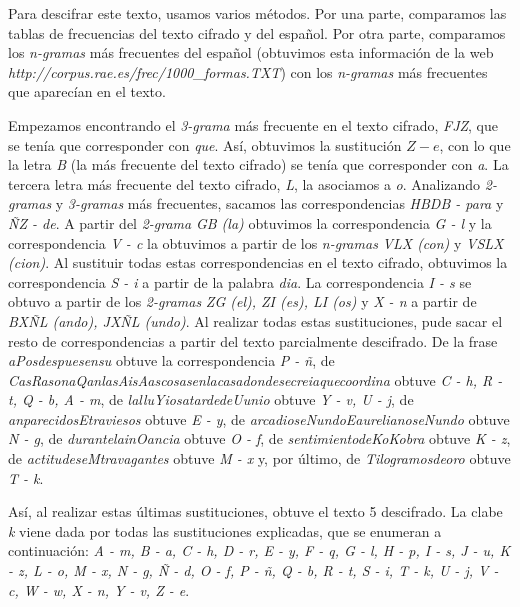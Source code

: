 \documentclass{article}
\begin{document}
    Para descifrar este texto, usamos varios métodos. Por una parte, comparamos las tablas de frecuencias del texto cifrado y del español. Por otra parte, comparamos los \emph{n-gramas} más frecuentes del español (obtuvimos esta información de la web \emph{http://corpus.rae.es/frec/1000\_formas.TXT}) con los \emph{n-gramas} más frecuentes que aparecían en el texto.
    
    Empezamos encontrando el \emph{3-grama} más frecuente en el texto cifrado, \emph{FJZ}, que se tenía que corresponder con \emph{que}. Así, obtuvimos la sustitución $Z - e$, con lo que la letra \emph{B} (la más frecuente del texto cifrado) se tenía que corresponder con \emph{a}. La tercera letra más frecuente del texto cifrado, \emph{L}, la asociamos a \emph{o}. Analizando \emph{2-gramas} y \emph{3-gramas} más frecuentes, sacamos las correspondencias \emph{HBDB - para} y \emph{ÑZ - de}. A partir del \emph{2-grama} \emph{GB (la)} obtuvimos la correspondencia \emph{G - l} y la correspondencia \emph{V - c} la obtuvimos a partir de los \emph{n-gramas} \emph{VLX (con)} y \emph{VSLX (cion)}. Al sustituir todas estas correspondencias en el texto cifrado, obtuvimos la correspondencia \emph{S - i} a partir de la palabra \emph{dia}. La correspondencia \emph{I - s} se obtuvo a partir de los \emph{2-gramas} \emph{ZG (el), ZI (es), LI (os)} y \emph{X - n} a partir de \emph{BXÑL (ando), JXÑL (undo)}. Al realizar todas estas sustituciones, pude sacar el resto de correspondencias a partir del texto parcialmente descifrado. De la frase \emph{aPosdespuesensu} obtuve la correspondencia \emph{P - ñ}, de \emph{CasRasonaQanlasAisAascosasenlacasadondesecreiaquecoordina} obtuve \emph{C - h, R - t, Q - b, A - m}, de \emph{lalluYiosatardedeUunio} obtuve \emph{Y - v, U - j}, de \emph{anparecidosEtraviesos} obtuve \emph{E - y}, de \emph{arcadioseNundoEaurelianoseNundo} obtuve \emph{N - g}, de \emph{durantelainOancia} obtuve \emph{O - f}, de \emph{sentimientodeKoKobra} obtuve \emph{K - z}, de \emph{actitudeseMtravagantes} obtuve \emph{M - x} y, por último, de \emph{Tilogramosdeoro} obtuve \emph{T - k}.
    
    Así, al realizar estas últimas sustituciones, obtuve el texto 5 descifrado. La clabe \emph{k} viene dada por todas las sustituciones explicadas, que se enumeran a continuación: 
    \emph{A - m, B - a, C - h, D - r, E - y, F - q, G - l, H - p, I - s, J - u, K - z, L - o, M - x, N - g, Ñ - d, O - f, P - ñ, Q - b, R - t, S - i, T - k, U - j, V - c, W - w, X - n, Y - v, Z - e}.
    
\end{document}

